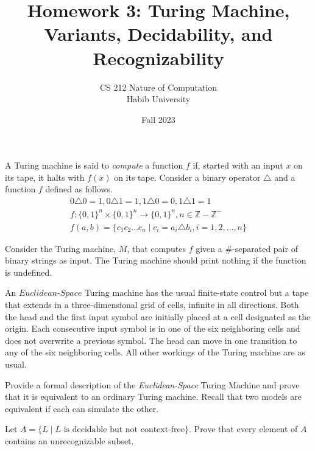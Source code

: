 \documentclass[addpoints,a4paper]{exam}
\title{Homework 3: Turing Machine, Variants, Decidability, and Recognizability}
\author{CS 212 Nature of Computation\\Habib University}
\date{Fall 2023}
\begin{document}
\maketitle

\begin{questions}

\question \label{q:lang} A Turing machine is said to \textit{compute} a function $f$ if, started with an input $x$ on its tape, it halts with $f(x)$ on its tape. Consider a binary operator $\triangle$ and a function $f$ defined as follows.
  \begin{align*}
    0\triangle 0=1, 0\triangle 1=1, 1\triangle 0=0,1\triangle 1=1\\
    f:\{0,1\}^n\times \{0,1\}^n\to \{0,1\}^n, n\in \mathbb{Z}-\mathbb{Z}^-    \\
    f(a,b) = \{ c_1c_2\ldots c_n \mid c_i = a_i\triangle b_i, i = 1,2,\ldots,n\}
  \end{align*}

Consider the Turing machine, $M$, that computes $f$ given a $\#$-separated pair of binary strings as input. The Turing machine should print nothing if the function is undefined.


\question [10] An $\textit{Euclidean-Space}$ Turing machine has the usual finite-state control but a tape that extends in a three-dimensional grid of cells, infinite in all directions. Both the head and the first input symbol are initially placed at a cell designated as the origin. Each consecutive input symbol is in one of the six neighboring cells and does not overwrite a previous symbol. The head can move in one transition to any of the six neighboring cells. All other workings of the Turing machine are as usual.

  Provide a formal description of the \textit{Euclidean-Space} Turing Machine and prove that it is equivalent to an ordinary Turing machine. Recall that two models are equivalent if each can simulate the other.
  
\question [10] Let $A = \{L \mid L\text{ is decidable but not context-free}\}$. Prove that every element of $A$ contains an unrecognizable subset.


\end{questions}
\end{document}
